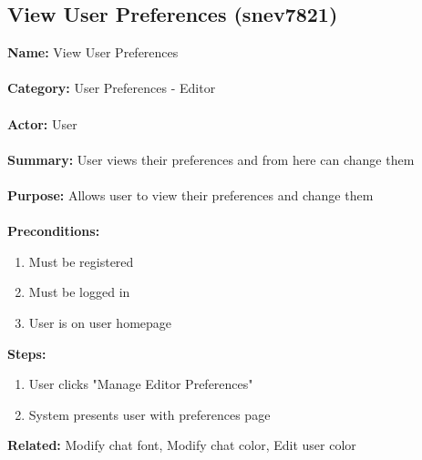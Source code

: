 \documentclass[11pt]{report}
\begin{document}
\subsection{View User Preferences (snev7821)}
\begin{framed}
	\noindent\textbf{Name:} View User Preferences \\ \\
	\textbf{Category:} User Preferences - Editor  \\ \\
	\textbf{Actor:} User \\ \\
	\textbf{Summary:} User views their preferences and from here can change them \\ \\
	\textbf{Purpose:} Allows user to view their preferences and change them \\ \\
	\textbf{Preconditions:} 
	\begin{enumerate}
		\item Must be registered
		\item Must be logged in
		\item User is on user homepage
	\end{enumerate}
	\textbf{Steps:}
	\begin{enumerate}
		\item User clicks "Manage Editor Preferences"
		\item System presents user with preferences page
	\end{enumerate}
	\textbf{Related:} Modify chat font, Modify chat color, Edit user color
\end{framed}

\newpage
\end{document}
